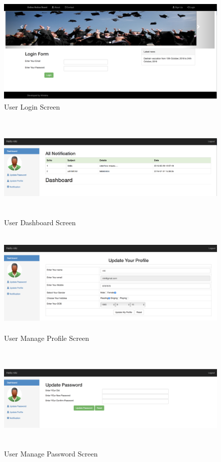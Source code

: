 \documentclass[12pt,a4paper]{article}
\begin{document}
    \begin{figure}[H]
    	\centering
    	\includegraphics[width=\textwidth,height=2in]{figures/user_login.png}
    	\caption{User Login Screen}
    \end{figure}
    
    \begin{figure}[H]
    	\centering
    	\includegraphics[width=\textwidth,height=2in]{figures/user_dashboard.png}
    	\caption{User Dashboard Screen}
    \end{figure}
    
    \begin{figure}[H]
    	\centering
    	\includegraphics[width=\textwidth,height=2in]{figures/user_update_profile.png}
    	\caption{User Manage Profile Screen}
    \end{figure}
    
    \begin{figure}[H]
    	\centering
    	\includegraphics[width=\textwidth,height=2in]{figures/user_update_password.png}
    	\caption{User Manage Password Screen}
    \end{figure}
    
\end{document}
